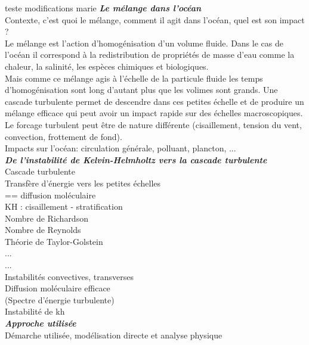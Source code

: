 \documentclass[a4paper,12pt]{article}
\begin{document}
    teste modifications marie
    \textbf{\textit{Le mélange dans l'océan}} \\
    Contexte, c'est quoi le mélange, comment il agit dans l'océan, quel est son impact ? \\
    Le mélange est l'action d'homogénisation d'un volume fluide. Dans le cas de l'océan il correspond à la redistribution de propriétés de masse d'eau comme la chaleur, la salinité, les espèces chimiques et biologiques. \\
    Mais comme ce mélange agis à l'échelle de la particule fluide les temps d'homogénisation sont long d'autant plus que les volimes sont grands. Une cascade turbulente permet de descendre dans ces petites échelle et de produire un mélange efficace qui peut avoir un impact rapide sur des échelles macroscopiques. \\
    Le forcage turbulent peut être de nature différente (cisaillement, tension du vent, convection, frottement de fond). \\
    Impacts sur l'océan: circulation générale, polluant, plancton, ... \\
    \newline
    \textbf{\textit{De l'instabilité de Kelvin-Helmholtz vers la cascade turbulente}} \\
    Cascade turbulente \\
    Transfère d'énergie vers les petites échelles \\
    == diffusion moléculaire \\
    KH : cisaillement - stratification \\
    Nombre de Richardson \\
    Nombre de Reynolds \\
    Théorie de Taylor-Golstein \\
    ... \\
    ... \\
    Instabilités convectives, transverses \\
    Diffusion moléculaire efficace \\
    (Spectre d'énergie turbulente) \\
    Instabilité de \acrfull{kh} \\
    \newline
    \textbf{\textit{Approche utilisée}} \\
    Démarche utilisée, modélisation directe et analyse physique
\end{document}
